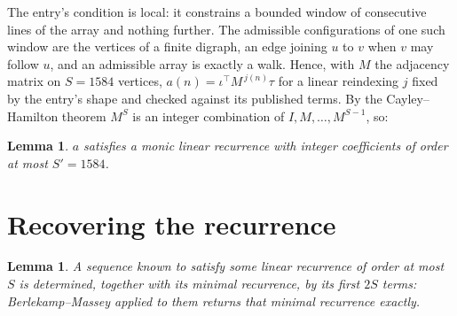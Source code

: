\documentclass[11pt,a4paper]{article}
\theoremstyle{plain}
\newtheorem{lemma}[theorem]{Lemma}
\theoremstyle{definition}
\begin{document}
The entry's condition is local: it constrains a bounded window of consecutive lines of the
array and nothing further. The admissible configurations of one such window are the vertices
of a finite digraph, an edge joining $u$ to $v$ when $v$ may follow $u$, and an admissible
array is exactly a walk. Hence, with $M$ the adjacency matrix on $S=1584$ vertices,
$a(n)=\iota^{\!\top}M^{\,j(n)}\tau$ for a linear reindexing $j$ fixed by the entry's shape
and checked against its published terms. By the Cayley--Hamilton theorem $M^{S}$ is an
integer combination of $I,M,\dots,M^{S-1}$, so:

\begin{lemma}\label{lem:cf}
$a$ satisfies a monic linear recurrence with integer coefficients of order at most
$S'=1584$.
\end{lemma}

\section{Recovering the recurrence}

\begin{lemma}\label{lem:bm}
A sequence known to satisfy some linear recurrence of order at most $S$ is determined, together
with its minimal recurrence, by its first $2S$ terms: Berlekamp--Massey applied to them returns
that minimal recurrence exactly.
\end{lemma}
\end{document}

